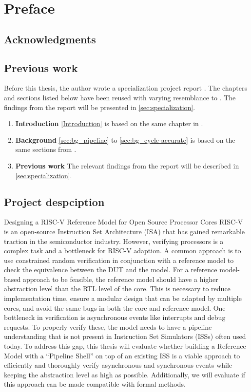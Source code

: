 \chapter*{Preface}

\section*{Acknowledgments}

\section*{Previous work}

Before this thesis, the author wrote a specialization project report \cite{torjenygaardeikenesDesigningRISCVReference2023}. The chapters and sections listed below have been reused with varying resemblance to \cite{torjenygaardeikenesDesigningRISCVReference2023}. The findings from the report will be presented in \cref{sec:specialization}.


\begin{enumerate}
    \item \textbf{Introduction} \cref{Introduction} is based on the same chapter in \cite{torjenygaardeikenesDesigningRISCVReference2023}.
    \item \textbf{Background} \cref{sec:bg_pipeline} to \cref{sec:bg_cycle-accurate} is based on the same sections from \cite{torjenygaardeikenesDesigningRISCVReference2023}.
    \item \textbf{Previous work} The relevant findings from the report will be described in \cref{sec:specialization}.
\end{enumerate}


\section*{Project despciption}
Designing a RISC-V Reference Model for Open Source Processor Cores
RISC-V is an open-source Instruction Set Architecture (ISA) that has gained remarkable traction in the semiconductor industry. However, verifying processors is a complex task and a bottleneck for RISC-V adaption. A common approach is to use constrained random verification in conjunction with a reference model to check the equivalence between the DUT and the model. 
For a reference model-based approach to be feasible, the reference model should have a higher abstraction level than the RTL level of the core. This is necessary to reduce implementation time, ensure a modular design that can be adapted by multiple cores, and avoid the same bugs in both the core and reference model. 
One bottleneck in verification is asynchronous events like interrupts and debug requests. To properly verify these, the model needs to have a pipeline understanding that is not present in Instruction Set Simulators (ISSs) often used today. To address this gap, this thesis will evaluate whether building a Reference Model with a “Pipeline Shell” on top of an existing ISS is a viable approach to efficiently and thoroughly verify asynchronous and synchronous events while keeping the abstraction level as high as possible. Additionally, we will evaluate if this approach can be made compatible with formal methods.

